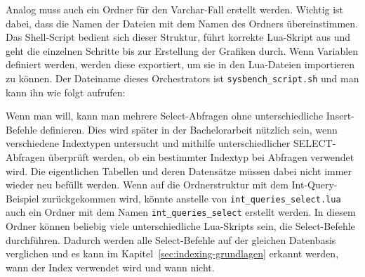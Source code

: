 Analog muss auch ein Ordner für den Varchar-Fall erstellt werden.
Wichtig ist dabei, dass die Namen der Dateien mit dem Namen des Ordners übereinstimmen.
Das Shell-Script bedient sich dieser Struktur, führt korrekte Lua-Skript aus und geht die einzelnen Schritte bis zur Erstellung der Grafiken durch.
Wenn Variablen definiert werden, werden diese exportiert, um sie in den Lua-Dateien importieren zu können.
Der Dateiname dieses Orchestrators ist \texttt{sysbench\_script.sh} und man kann ihn wie folgt aufrufen:

\vspace{-10pt}

\vspace{-5pt}

Wenn man will, kann man mehrere Select-Abfragen ohne unterschiedliche Insert-Befehle definieren.
Dies wird später in der Bachelorarbeit nützlich sein, wenn verschiedene Indextypen untersucht und mithilfe unterschiedlicher SELECT-Abfragen überprüft werden, ob ein bestimmter Indextyp bei Abfragen verwendet wird.
Die eigentlichen Tabellen und deren Datensätze müssen dabei nicht immer wieder neu befüllt werden.
Wenn auf die Ordnerstruktur mit dem Int-Query-Beispiel zurückgekommen wird, könnte anstelle von \texttt{int\_queries\_select.lua} auch ein Ordner mit dem Namen \texttt{int\_queries\_select} erstellt werden.
In diesem Ordner können beliebig viele unterschiedliche Lua-Skripts sein, die Select-Befehle durchführen.
Dadurch werden alle Select-Befehle auf der gleichen Datenbasis verglichen und es kann im Kapitel~\ref{sec:indexing-grundlagen} erkannt werden, wann der Index verwendet wird und wann nicht.

